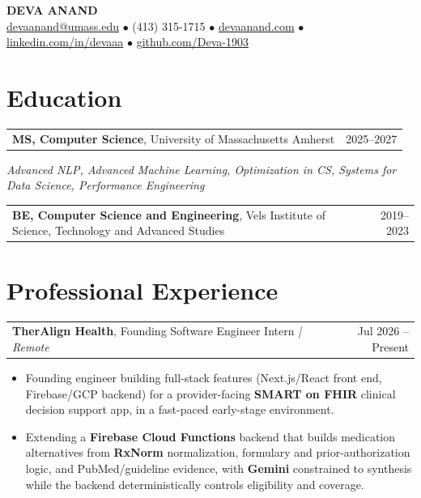 \documentclass[letterpaper,11pt]{article}
\makeatletter
\newcommand{\eduItem}[3]{%
  \begin{tabular*}{\textwidth}{@{}l@{\extracolsep{\fill}}r@{}}
    \textbf{#1}, #2 & #3 \\
  \end{tabular*}\par
}
\newcommand{\expItem}[4]{%
  \vspace{2pt}
  \begin{tabular*}{\textwidth}{@{}l@{\extracolsep{\fill}}r@{}}
    \textbf{#1}, #2 \textit{| #3} & #4 \\
  \end{tabular*}\par\vspace{-3pt}
}
\makeatother
\begin{document}
\begin{center}
    {\fontsize{18}{20}\selectfont\bfseries DEVA ANAND}\\ \vspace{3pt}
    {\small
    \href{mailto:devaanand@umass.edu}{devaanand@umass.edu}
    \enspace$\bullet$\enspace
    (413) 315-1715
    \enspace$\bullet$\enspace
    \href{https://devaanand.com}{devaanand.com}
    \enspace$\bullet$\enspace
    \href{https://linkedin.com/in/devaaa/}{linkedin.com/in/devaaa}
    \enspace$\bullet$\enspace
    \href{https://github.com/Deva-1903}{github.com/Deva-1903}}
\end{center}
\vspace{-8pt}

\section{Education}
\eduItem{MS, Computer Science}{University of Massachusetts Amherst}{2025--2027}
{\small\textit{Advanced NLP, Advanced Machine Learning, Optimization in CS, Systems for Data Science, Performance Engineering}}\par
\vspace{3pt}
\eduItem{BE, Computer Science and Engineering}{Vels Institute of Science, Technology and Advanced Studies}{2019--2023}

\section{Professional Experience}

\expItem{TherAlign Health}{Founding Software Engineer Intern}{Remote}{Jul 2026 -- Present}
\begin{itemize}
  \item Founding engineer building full-stack features (Next.js/React front end, Firebase/GCP backend) for a provider-facing \textbf{SMART on FHIR} clinical decision support app, in a fast-paced early-stage environment.
  \item Extending a \textbf{Firebase Cloud Functions} backend that builds medication alternatives from \textbf{RxNorm} normalization, formulary and prior-authorization logic, and PubMed/guideline evidence, with \textbf{Gemini} constrained to synthesis while the backend deterministically controls eligibility and coverage.
\end{itemize}
\end{document}
